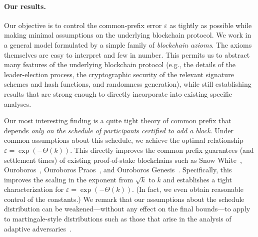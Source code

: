 \paragraph{Our results.}
Our objective is to control the common-prefix error
$\varepsilon$ as tightly as possible while
making minimal assumptions on the underlying blockchain
protocol.  We work in a general model formulated by a simple family of
\emph{blockchain axioms}. The axioms themselves are easy to interpret
and few in number. This permits us to abstract many features of the
underlying blockchain protocol (e.g., the details of the
leader-election process, the cryptographic security of the relevant
signature schemes and hash functions, and randomness generation),
while still establishing results that are strong enough to directly
incorporate into existing specific analyses.

Our most interesting finding is a quite tight theory of common prefix
that depends \emph{only on the schedule of participants certified to
  add a block}. Under common assumptions about this schedule, we
achieve the optimal relationship $\varepsilon =
\exp(-\Theta(k))$. This directly improves the common prefix guarantees
(and settlement times) of existing proof-of-stake blockchains such as
Snow White~\cite{DBLP:journals/iacr/BentovPS16a},
Ouroboros~\cite{KRDO17}, Ouroboros
Praos~\cite{DBLP:conf/eurocrypt/DavidGKR18}, and Ouroboros
Genesis~\cite{DBLP:journals/iacr/BadertscherGKRZ18}.
%
Specifically, this improves the scaling in the exponent from
$\sqrt{k}$ to $k$ and establishes a tight characterization for
$\varepsilon = \exp(-\Theta(k))$. (In fact, we even obtain reasonable
control of the constants.)  We remark that our assumptions about the
schedule distribution can be weakened---without any effect on the
final bounds---to apply to martingale-style distributions such
as those that arise in the analysis of adaptive
adversaries~\cite{DBLP:conf/eurocrypt/DavidGKR18,DBLP:journals/iacr/BadertscherGKRZ18}.


